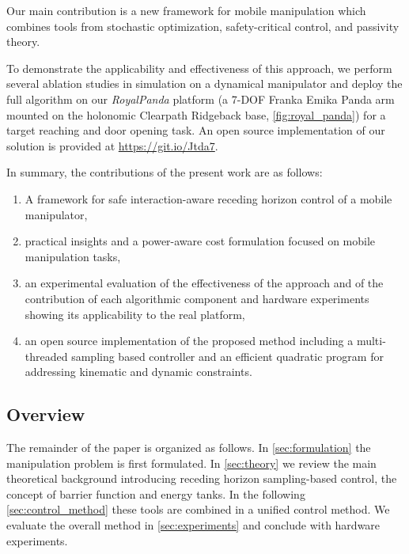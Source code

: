 Our main contribution is a new framework for mobile manipulation which combines tools from stochastic optimization, safety-critical control, and passivity theory.

To demonstrate the applicability and effectiveness of this approach, we perform several ablation studies in simulation on a dynamical manipulator and deploy the full algorithm on our \textit{RoyalPanda} platform (a 7-DOF Franka Emika Panda arm mounted on the holonomic Clearpath Ridgeback base, \fig\ref{fig:royal_panda}) for a target reaching and door opening task. An open source implementation of our solution is provided at \url{https://git.io/Jtda7}.

In summary, the contributions of the present work are as follows:
\begin{enumerate}
    \item A framework for safe interaction-aware receding horizon control of a mobile manipulator,
    \item practical insights and a power-aware cost formulation focused on mobile manipulation tasks,
    \item an experimental evaluation of the effectiveness of the approach and of the contribution of each algorithmic component and hardware experiments showing its applicability to the real platform,
    \item an open source implementation of the proposed method including a multi-threaded sampling based controller and an efficient quadratic program for addressing kinematic and dynamic constraints.
    \end{enumerate}

\subsection{Overview}

The remainder of the paper is organized as follows. In 
\sect \ref{sec:formulation} the manipulation problem is first formulated. In \sect \ref{sec:theory} we review the main theoretical background introducing receding horizon sampling-based control, the concept of barrier function and energy tanks. In the following \sect \ref{sec:control_method} these tools are combined in a unified control method. We evaluate the overall method in \sect \ref{sec:experiments} and conclude with  hardware experiments. 
